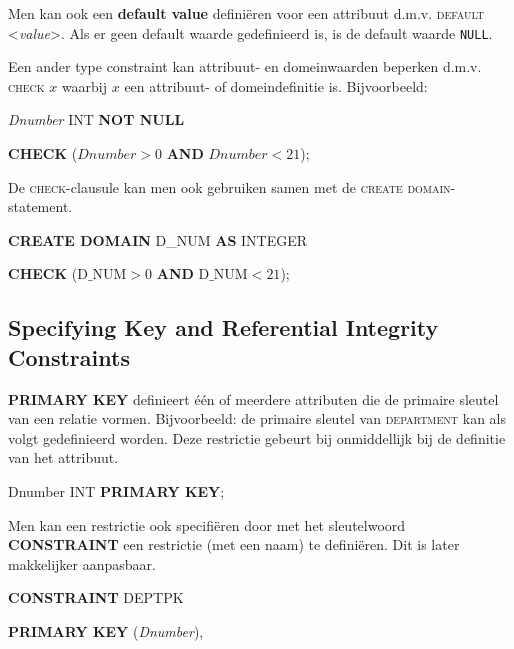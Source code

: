 Men kan ook een \textbf{default value} defini\"eren voor een attribuut d.m.v. \textsc{default} {\textless}\textit{value}{\textgreater}. Als er geen default waarde gedefinieerd is, is de default waarde \texttt{NULL}.

Een ander type constraint kan attribuut- en domeinwaarden beperken d.m.v. \textsc{check} $x$ waarbij $x$ een attribuut- of domeindefinitie is. Bijvoorbeeld:

\vspace{1mm}\hspace{10mm}
\textit{Dnumber} INT \textbf{NOT NULL}

\hspace{10mm}
\textbf{CHECK} ($\textit{Dnumber} >0$ \textbf{AND} $\textit{Dnumber} <21$);
\vspace{3mm}

\noindent De \textsc{check}-clausule kan men ook gebruiken samen met de \textsc{create domain}-statement.

\vspace{1mm}\hspace{10mm}
\textbf{CREATE DOMAIN} D\_NUM \textbf{AS} INTEGER

\hspace{10mm}
\textbf{CHECK} ($\text{D\_NUM} >0$ \textbf{AND} $\text{D\_NUM} <21$); 


\subsection{Specifying Key and Referential Integrity Constraints}
\textbf{PRIMARY KEY} definieert \'e\'en of meerdere attributen die de primaire sleutel van een relatie vormen. Bijvoorbeeld: de primaire sleutel van \textsc{department} kan als volgt gedefinieerd worden. Deze restrictie gebeurt bij onmiddellijk bij de definitie van het attribuut.

\vspace{1mm}\hspace{10mm}
Dnumber INT \textbf{PRIMARY KEY};
\vspace{3mm}

\noindent Men kan een restrictie ook specifi\"eren door met het sleutelwoord \textbf{CONSTRAINT} een restrictie (met een naam) te defini\"eren. Dit is later makkelijker aanpasbaar.

\vspace{1mm}\hspace{10mm}
\textbf{CONSTRAINT} DEPTPK

\hspace{15mm}
\textbf{PRIMARY KEY} (\textit{Dnumber}),

